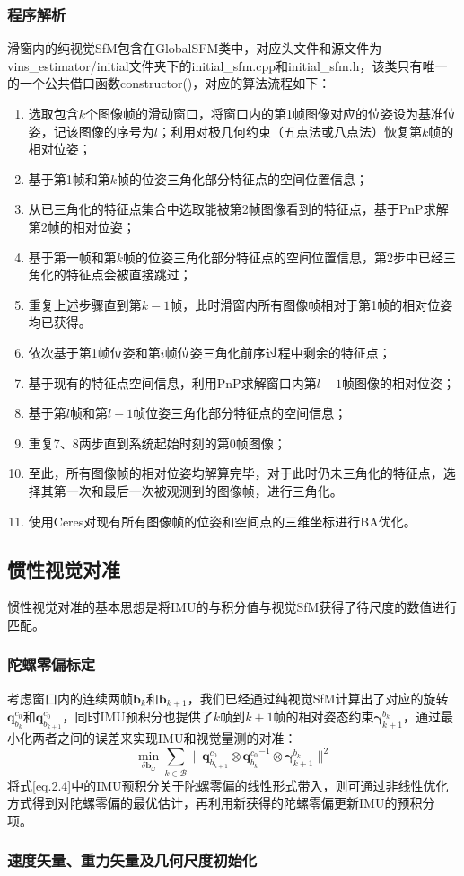 \subsubsection{程序解析}
滑窗内的纯视觉SfM包含在GlobalSFM类中，对应头文件和源文件为vins\_estimator/initial文件夹下的initial\_sfm.cpp和initial\_sfm.h，该类只有唯一的一个公共借口函数constructor()，对应的算法流程如下：
\begin{enumerate}
	\item 选取包含$k$个图像帧的滑动窗口，将窗口内的第1帧图像对应的位姿设为基准位姿，记该图像的序号为$l$；利用对极几何约束（五点法或八点法）恢复第$k$帧的相对位姿；
	\item 基于第1帧和第$k$帧的位姿三角化部分特征点的空间位置信息；
	\item 从已三角化的特征点集合中选取能被第2帧图像看到的特征点，基于PnP求解第2帧的相对位姿；
	\item 基于第一帧和第$k$帧的位姿三角化部分特征点的空间位置信息，第2步中已经三角化的特征点会被直接跳过；
	\item 重复上述步骤直到第$k-1$帧，此时滑窗内所有图像帧相对于第1帧的相对位姿均已获得。
	\item 依次基于第1帧位姿和第$i$帧位姿三角化前序过程中剩余的特征点；
	\item 基于现有的特征点空间信息，利用PnP求解窗口内第$l-1$帧图像的相对位姿；
	\item 基于第$l$帧和第$l-1$帧位姿三角化部分特征点的空间信息；
	\item 重复7、8两步直到系统起始时刻的第0帧图像；
	\item 至此，所有图像帧的相对位姿均解算完毕，对于此时仍未三角化的特征点，选择其第一次和最后一次被观测到的图像帧，进行三角化。
	\item 使用Ceres对现有所有图像帧的位姿和空间点的三维坐标进行BA优化。
	
\end{enumerate}
\subsection{惯性视觉对准}
惯性视觉对准的基本思想是将IMU的与积分值与视觉SfM获得了待尺度的数值进行匹配。
\subsubsection{陀螺零偏标定}
考虑窗口内的连续两帧$\bm{b}_k$和$\bm{b}_{k+1}$，我们已经通过纯视觉SfM计算出了对应的旋转$\bm{q}_{b_k}^{c_0}$和$\bm{q}_{b_{k+1}}^{c_0}$，同时IMU预积分也提供了$k$帧到$k+1$帧的相对姿态约束$\bm{\gamma}^{b_k}_{k+1}$，通过最小化两者之间的误差来实现IMU和视觉量测的对准：
\begin{equation}
\min\limits_{\delta\bm{b}_\omega}\sum\limits_{k\in\mathcal{B}}\|\bm{q}_{b_{k+1}}^{c_0}\otimes{\bm{q}_{b_k}^{c_0}}^{-1}\otimes\bm{\gamma}^{b_k}_{k+1}\|^2
\end{equation}
将式\ref{eq.2.4}中的IMU预积分关于陀螺零偏的线性形式带入，则可通过非线性优化方式得到对陀螺零偏的最优估计，再利用新获得的陀螺零偏更新IMU的预积分项。
\subsubsection{速度矢量、重力矢量及几何尺度初始化}
